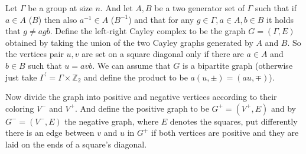 \begin{definition}

%
%
%
  Let $\Gamma$ be a group at size $n$. And let $A,B$ be a two generator set of $\Gamma$ such that if $a \in A$ ($B$) then also $a^{-1}\in A$ ($B^{-1}$) and that for any $g\in \Gamma, a \in A, b \in B$ it holds that $g \neq agb$. Define the left-right Cayley complex to be the graph $G = \left( \Gamma, E \right)$ obtained by taking the union of the two Cayley graphs generated by $A$ and $B$. So the vertices pair $u,v$ are set on a square diagonal only if there are $a\in A$ and $b \in B$ such that $u = avb$. We can assume that $G$ is a bipartite graph (otherwise just take $\Gamma^{\prime} = \Gamma \times \mathbb{Z}_{2}$ and define the product to be $a\left( u,\pm \right) = \left( au, \mp \right)$). 


Now divide the graph into positive and negative vertices according to their coloring $V^{-}$ and $V^{+}$. And define the positive graph to be $G^{+} = \left( V^{+}, E \right)$ and by $G^{-} = \left( V^{-}, E \right)$ the negative graph, where $E$ denotes the squares, put differently there is an edge between $v$ and $u$ in $G^{+}$ if both vertices are positive and they are laid on the ends of a square's diagonal.



\end{definition}
